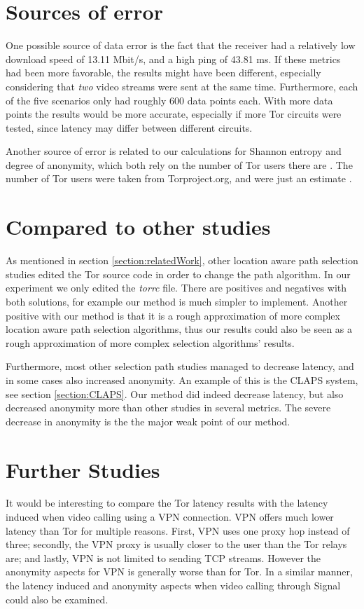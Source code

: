 \documentclass{kththesis}
\begin{document}
\section{Sources of error}
One possible source of data error is the fact that the receiver had a relatively low download speed of 13.11 Mbit/s, and a high ping of 43.81 ms. If these metrics had been more favorable, the results might have been different, especially considering that \emph{two} video streams were sent at the same time. Furthermore, each of the five scenarios only had roughly 600 data points each. With more data points the results would be more accurate, especially if more Tor circuits were tested, since latency may differ between different circuits.

Another source of error is related to our calculations for Shannon entropy and degree of anonymity, which both rely on the number of Tor users there are \parencite{tormetricsUserStats}. The number of Tor users were taken from Torproject.org, and were just an estimate \parencite{tormetricsAboutUserMetrics}.

\section{Compared to other studies}
As mentioned in section \ref{section:relatedWork}, other location aware path selection studies edited the Tor source code in order to change the path algorithm. In our experiment we only edited the \emph{torrc} file. There are positives and negatives with both solutions, for example our method is much simpler to implement. Another positive with our method is that it is a rough approximation of more complex location aware path selection algorithms, thus our results could also be seen as a rough approximation of more complex selection algorithms' results.

Furthermore, most other selection path studies managed to decrease latency, and in some cases also increased anonymity. An example of this is the CLAPS system, see section \ref{section:CLAPS}. Our method did indeed decrease latency, but also decreased anonymity more than other studies in several metrics. The severe decrease in anonymity is the the major weak point of our method.

\section{Further Studies}
It would be interesting to compare the Tor latency results with the latency induced when video calling using a VPN connection. VPN offers much lower latency than Tor for multiple reasons. First, VPN uses one proxy hop instead of three; secondly, the VPN proxy is usually closer to the user than the Tor relays are; and lastly, VPN is not limited to sending TCP streams. However the anonymity aspects for VPN is generally worse than for Tor. In a similar manner, the latency induced and anonymity aspects when video calling through Signal could also be examined.
\end{document}
